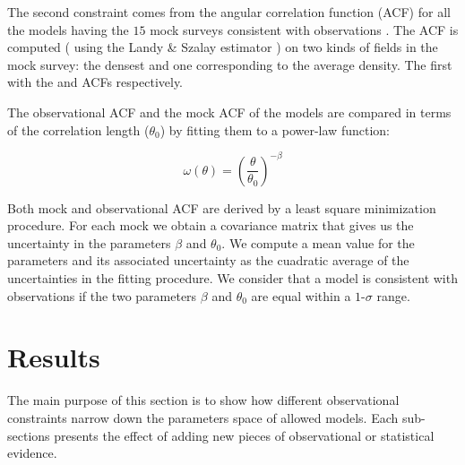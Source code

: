 \documentclass[usenatbib]{mn2e}
\begin{document}
The second constraint  comes from the angular correlation function (ACF)
for all the models having the $15$ mock surveys consistent with
observations . The ACF is computed  ( using 
the Landy \&  Szalay  estimator \citep{Landy1993} )  on two kinds of
fields in the mock survey: the densest and one corresponding to the
average density. The first with the \cite{Hayashino2004}  and \cite{Ouchi2010}
ACFs respectively. 

The observational ACF and the  mock  ACF of the models are compared   
in terms of the correlation length ($\theta_{0}$) by fitting 
them to a power-law function:  

\begin{equation}
\omega(\theta) = \left(\frac{\theta}{\theta_{0}}\right)^{-\beta}
\label{eq:fitting}
\end{equation}

Both mock and observational ACF are derived by a least square
minimization procedure. For each mock we obtain a covariance matrix
that gives us the uncertainty in the parameters $\beta$ and
$\theta_0$. We compute a mean value for the parameters and its
associated uncertainty as the cuadratic average of the uncertainties in
the fitting procedure. We consider that a model is consistent with
observations if the two parameters $\beta$ and $\theta_0$ are equal
within a $1$-$\sigma$ range.  



 
\section{Results}
\label{sec:results}

The main purpose of this section is to show how different
observational constraints narrow down the parameters space of allowed
models. Each sub-sections presents the effect of adding new pieces of
observational or statistical evidence. 
\end{document}
